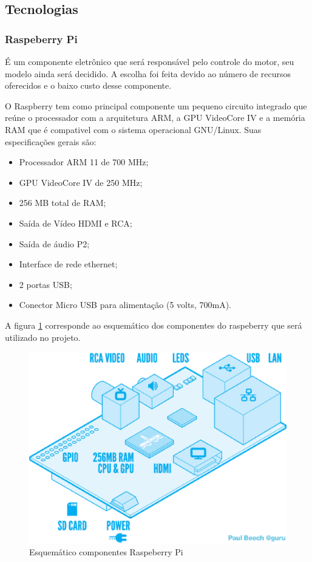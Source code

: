 \subsection{Tecnologias}

\subsubsection{Raspeberry Pi}

É um componente eletrônico que será responsável pelo controle do motor, seu modelo ainda será decidido. A escolha foi feita devido ao número de recursos oferecidos e o baixo custo desse componente.

O Raspberry  tem como principal componente um pequeno circuito integrado que reúne o processador com a arquitetura ARM, a GPU VideoCore IV e a memória RAM que é compativel com o sistema operacional GNU/Linux. Suas especificações gerais são:

\begin{itemize}
 \item Processador ARM 11 de 700 MHz;
 \item GPU VideoCore IV de 250 MHz;
 \item 256 MB total de RAM;
 \item Saída de Vídeo HDMI e RCA;
 \item Saída de áudio P2;
 \item Interface de rede ethernet;
 \item 2 portas USB;
 \item Conector Micro USB para alimentação (5 volts, 700mA).
\end{itemize}

A figura \ref{fig:rasp} corresponde ao esquemático dos componentes do raspeberry que será utilizado no projeto.

\begin{figure}[!htb]
\centering
  \includegraphics[keepaspectratio=true,scale=0.6]{figuras/controle/blueprint_rasp}
\caption{Esquemático componentes Raspeberry Pi}
\label{fig:rasp}
\end{figure}

